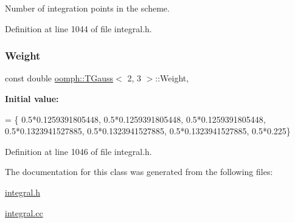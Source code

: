 Number of integration points in the scheme. 



Definition at line 1044 of file integral.\+h.

\mbox{\label{classoomph_1_1TGauss_3_012_00_013_01_4_a64cf0175f3adc12733785facec339c63}} 
\subsubsection{\texorpdfstring{Weight}{Weight}}
{\footnotesize\ttfamily const double \hyperlink{classoomph_1_1TGauss}{oomph\+::\+T\+Gauss}$<$ 2, 3 $>$\+::Weight\hspace{0.3cm}{\ttfamily [static]}, {\ttfamily [private]}}

{\bfseries Initial value\+:}
\begin{DoxyCode}
= \{
0.5*0.1259391805448,
0.5*0.1259391805448,
0.5*0.1259391805448,
0.5*0.1323941527885,
0.5*0.1323941527885,
0.5*0.1323941527885,
0.5*0.225\}
\end{DoxyCode}


Definition at line 1046 of file integral.\+h.



The documentation for this class was generated from the following files\+:\begin{DoxyCompactItemize}
\item 
\hyperlink{integral_8h}{integral.\+h}\item 
\hyperlink{integral_8cc}{integral.\+cc}\end{DoxyCompactItemize}
